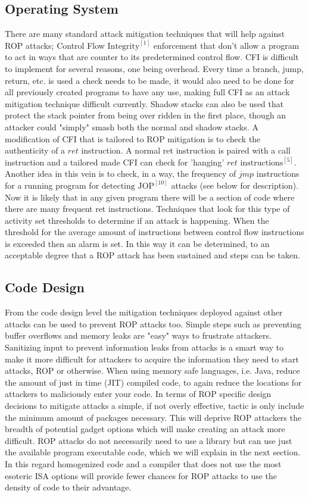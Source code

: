 \documentclass[11pt]{amsart}
\begin{document}
\subsection*{Operating System}
There are many standard attack mitigation techniques that will help against ROP attacks; Control Flow $\text{Integrity}^{[1]}$ enforcement that don't allow a program to act in ways that are counter to its predetermined control flow. CFI is difficult to implement for several reasons, one being overhead. Every time a branch, jump, return, etc. is used a check needs to be made, it would also need to be done for all previously created programs to have any use, making full CFI as an attack mitigation technique difficult currently. Shadow stacks can also be used that protect the stack pointer from being over ridden in the first place, though an attacker could "simply" smash both the normal and shadow stacks. \newline \newline
A modification of CFI that is tailored to ROP mitigation is to check the authenticity of a $ret$ instruction. A normal ret instruction is paired with a call instruction and a tailored made CFI can check for 'hanging' $ret$ $\text{instructions}^{[5]}$. Another idea in this vein is to check, in a way, the frequency of $jmp$ instructions for a running program for $\text{detecting JOP}^{[10]}$ attacks (see below for description). Now it is likely that in any given program there will be a section of code where there are many frequent ret instructions. Techniques that look for this type of activity set thresholds to determine if an attack is happening. When the threshold for the average amount of instructions between control flow instructions is exceeded then an alarm is set. In this way it can be determined, to an acceptable degree that a ROP attack has been sustained and steps can be taken.
\subsection*{Code Design}
From the code design level the mitigation techniques deployed against other attacks can be used to prevent ROP attacks too. Simple steps such as preventing buffer overflows and memory leaks are "easy" ways to frustrate attackers. Sanitizing input to prevent information leaks from attacks is a smart way to make it more difficult for attackers to acquire the information they need to start attacks, ROP or otherwise. When using memory safe languages, i.e. Java, reduce the amount of just in time (JIT) compiled code, to again reduce the locations for attackers to maliciously enter your code.\newline \newline
In terms of ROP specific design decisions to mitigate attacks a simple, if not overly effective, tactic is only include the minimum amount of packages necessary. This will deprive ROP attackers the breadth of potential gadget options which will make creating an attack more difficult. ROP attacks do not necessarily need to use a library but can use just the available program executable code, which we will explain in the next section. In this regard homogenized code and a compiler that does not use the most esoteric ISA options will provide fewer chances for ROP attacks to use the density of code to their advantage.
\end{document}

